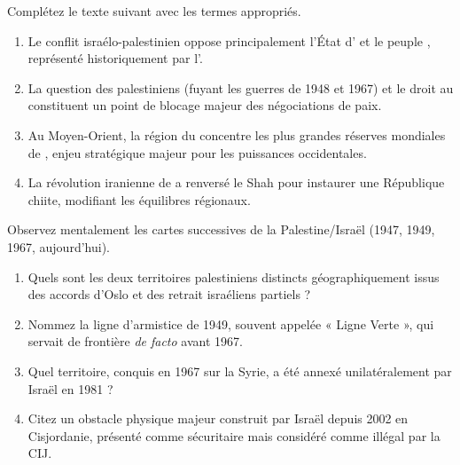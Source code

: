 \documentclass[11pt]{article}
\begin{document}
\begin{exercice}
Complétez le texte suivant avec les termes appropriés.
\begin{enumerate}
    \item Le conflit israélo-palestinien oppose principalement l'État d'\underline{\hspace{3cm}} et le peuple \underline{\hspace{3cm}}, représenté historiquement par l'\underline{\hspace{3cm}}.
    \item La question des \underline{\hspace{3cm}} palestiniens (fuyant les guerres de 1948 et 1967) et le droit au \underline{\hspace{3cm}} constituent un point de blocage majeur des négociations de paix.
    \item Au Moyen-Orient, la région du \underline{\hspace{3cm}} concentre les plus grandes réserves mondiales de \underline{\hspace{3cm}}, enjeu stratégique majeur pour les puissances occidentales.
    \item La révolution iranienne de \underline{\hspace{3cm}} a renversé le Shah pour instaurer une République \underline{\hspace{3cm}} chiite, modifiant les équilibres régionaux.
\end{enumerate}
\end{exercice}

\begin{exercice}
Observez mentalement les cartes successives de la Palestine/Israël (1947, 1949, 1967, aujourd'hui).
\begin{enumerate}
    \item Quels sont les deux territoires palestiniens distincts géographiquement issus des accords d'Oslo et des retrait israéliens partiels ?
    \item Nommez la ligne d'armistice de 1949, souvent appelée « Ligne Verte », qui servait de frontière \textit{de facto} avant 1967.
    \item Quel territoire, conquis en 1967 sur la Syrie, a été annexé unilatéralement par Israël en 1981 ?
    \item Citez un obstacle physique majeur construit par Israël depuis 2002 en Cisjordanie, présenté comme sécuritaire mais considéré comme illégal par la CIJ.
\end{enumerate}
\end{exercice}
\end{document}
